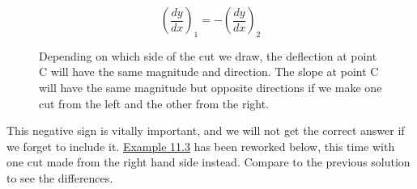 \documentclass[
  letterpaper,
  DIV=11,
  numbers=noendperiod]{scrreprt}
\begin{document}
\[
\left(\frac{d y}{d x}\right)_{1}=-\left(\frac{d y}{d x}\right)_{2}
\]

\begin{figure}


\caption{\label{fig-11.5}Depending on which side of the cut we draw, the
deflection at point C will have the same magnitude and direction. The
slope at point C will have the same magnitude but opposite directions if
we make one cut from the left and the other from the right.}

\end{figure}%

This negative sign is vitally important, and we will not get the correct
answer if we forget to include it. \hyperref[example-11.3b]{Example
11.3} has been reworked below, this time with one cut made from the
right hand side instead. Compare to the previous solution to see the
differences.
\end{document}

